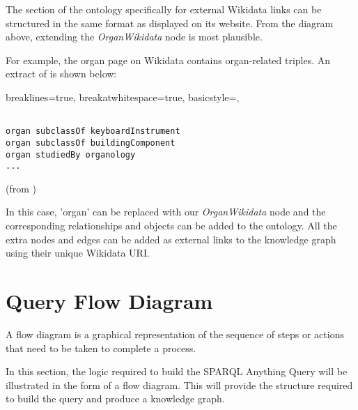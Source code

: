 The section of the ontology specifically for external Wikidata links can be structured in the same format as displayed on its website. From the diagram above, extending the \textit{OrganWikidata} node is most plausible.

For example, the organ page on Wikidata \cite{organwikidata} contains organ-related triples. An extract of \cite{organwikidata} is shown below:

\lstset
{
    breaklines=true,
    breakatwhitespace=true,
    basicstyle=\ttfamily,
}
\begin{lstlisting}

organ subclassOf keyboardInstrument
organ subclassOf buildingComponent
organ studiedBy organology 
...

\end{lstlisting}
(from \cite{organwikidata})

In this case, 'organ' can be replaced with our \textit{OrganWikidata} node and the corresponding relationships and objects can be added to the ontology. All the extra nodes and edges can be added as external links to the knowledge graph using their unique Wikidata URI. 

\section{Query Flow Diagram}
\hspace{0.5cm} A flow diagram is a graphical representation of the sequence of steps or actions that need to be taken to complete a process. \cite{flowchart}

In this section, the logic required to build the SPARQL Anything Query will be illustrated in the form of a flow diagram. This will provide the structure required to build the query and produce a knowledge graph.

